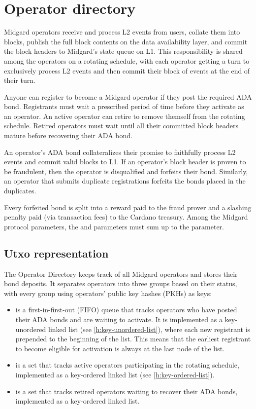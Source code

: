 \documentclass[../midgard.tex]{subfiles}
\begin{document}
\section{Operator directory}
\label{h:operator-directory}

Midgard operators receive and process L2 events from users, collate them into blocks, publish the full block contents on the data availability layer, and commit the block headers to Midgard's state queue on L1.
This responsibility is shared among the operators on a rotating schedule, with each operator getting a turn to exclusively process L2 events and then commit their block of events at the end of their turn.

Anyone can register to become a Midgard operator if they post the required ADA bond.
Registrants must wait a prescribed period of time before they activate as an operator.
An active operator can retire to remove themself from the rotating schedule.
Retired operators must wait until all their committed block headers mature before recovering their ADA bond.

An operator's ADA bond collateralizes their promise to faithfully process L2 events and commit valid blocks to L1.
If an operator's block header is proven to be fraudulent, then the operator is disqualified and forfeits their bond.
Similarly, an operator that submits duplicate registrations forfeits the bonds placed in the duplicates.

Every forfeited bond is split into a reward paid to the fraud prover and a slashing penalty paid (via transaction fees) to the Cardano treasury.
Among the Midgard protocol parameters, the  and  parameters must sum up to the  parameter.

\subsection{Utxo representation}
\label{h:operator-directory-utxo-representation}

The Operator Directory keeps track of all Midgard operators and stores their bond deposits.
It separates operators into three groups based on their status, with every group using operators' public key hashes (PKHs) as keys:
\begin{itemize}
    \item {} is a first-in-first-out (FIFO) queue that tracks operators who have posted their ADA bonds and are waiting to activate.
      It is implemented as a key-unordered linked list (see \cref{h:key-unordered-list}), where each new registrant is prepended to the beginning of the list.
      This means that the earliest registrant to become eligible for activation is always at the last node of the list.
    \item {} is a set that tracks active operators participating in the rotating schedule, implemented as a key-ordered linked list (see \cref{h:key-ordered-list}).
    \item {} is a set that tracks retired operators waiting to recover their ADA bonds, implemented as a key-ordered linked list.
\end{itemize}
\end{document}
